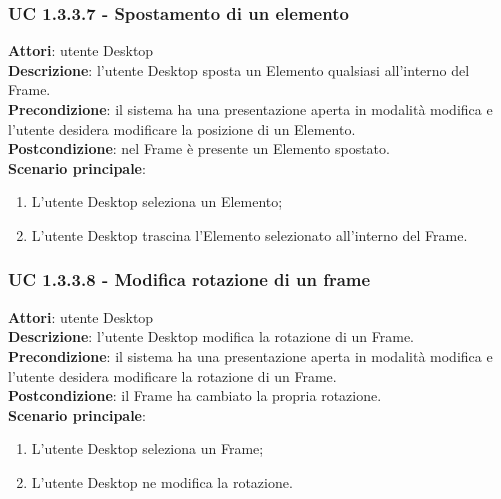 \subsubsection{UC 1.3.3.7 - Spostamento di un elemento}{
	\label{uc1.3.3.7}
	\textbf{Attori}: utente Desktop \\
	\textbf{Descrizione}: l'utente Desktop sposta un Elemento qualsiasi all'interno del Frame. \\
	\textbf{Precondizione}: il sistema ha una presentazione aperta in modalità modifica e l'utente desidera modificare la posizione di un Elemento.	\\
	\textbf{Postcondizione}: nel Frame è presente un Elemento spostato.	\\
	\textbf{Scenario principale}:
	\begin{enumerate}
		\item L'utente Desktop seleziona un Elemento;
		\item L'utente Desktop trascina l'Elemento selezionato all'interno del Frame.
	\end{enumerate}
	}
\subsubsection{UC 1.3.3.8 - Modifica rotazione di un frame}{
	\label{uc1.3.3.8}
	\textbf{Attori}: utente Desktop \\
	\textbf{Descrizione}: l'utente Desktop modifica la rotazione di un Frame. \\
	\textbf{Precondizione}: il sistema ha una presentazione aperta in modalità modifica e l'utente desidera modificare la rotazione di un Frame.	\\
	\textbf{Postcondizione}: il Frame ha cambiato la propria rotazione.	\\
	\textbf{Scenario principale}:
	\begin{enumerate}
		\item L'utente Desktop seleziona un Frame;
		\item L'utente Desktop ne modifica la rotazione.
	\end{enumerate}
	}

